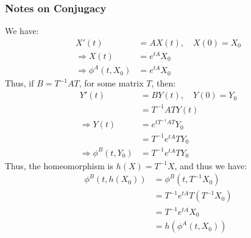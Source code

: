 \documentclass[crop=false,class=book,oneside]{standalone}
\begin{document}
            \subsubsection{Notes on Conjugacy}
                We have:
                \begin{align*}
                    X'(t)&=AX(t),
                    \quad
                    X(0)=X_{0}\\
                    \Rightarrow
                    X(t)&=e^{tA}X_{0}\\
                    \Rightarrow\phi^{A}(t,X_{0})&=e^{tA}X_{0}
                \end{align*}
                Thus, if $B=T^{-1}AT$, for some matrix $T$, then:
                \begin{align*}
                    Y'(t)&=BY(t),
                    \quad
                    Y(0)=Y_{0}\\
                    &=T^{-1}ATY(t)\\
                    \Rightarrow
                    Y(t)
                    &=e^{tT^{-1}AT}Y_{0}\\
                    &=T^{-1}e^{tA}TY_{0}\\
                    \Rightarrow
                    \phi^{B}(t,Y_{0})
                    &=T^{-1}e^{tA}TY_{0}
                \end{align*}
                Thus, the homeomorphism is $h(X)=T^{-1}X$,
                and thus we have:
                \begin{align*}
                    \phi^{B}(t,h(X_{0}))
                    &=\phi^{B}(t,T^{-1}X_{0})\\
                    &=T^{-1}e^{tA}T(T^{-1}X_{0})\\
                    &=T^{-1}e^{tA}X_{0}\\
                    &=h(\phi^{A}(t,X_{0}))
                \end{align*}
\end{document}
